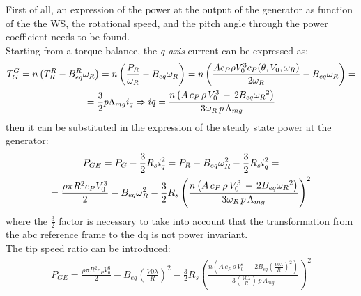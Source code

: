 First of all, an expression of the power at the output of the generator as function of the the WS, the rotational speed, and the pitch angle through the power coefficient needs to be found. \\
Starting from a torque balance, the \textit{q-axis} current can be expressed as:
\begin{gather}
  T_G^G = n\left(T_R^R - B_{eq}^R\omega_R\right) = n\left(\frac{P_R}{\omega_R} - B_{eq}\omega_R\right) = n\left(\frac{A c_P \rho V_0^3 c_P(\theta, V_0, \omega_R)}{2\omega_R} - B_{eq}\omega_R\right) = \notag \\
   = \frac{3}{2}p\Lambda_{mg}i_q \Rightarrow iq = \frac{n\left(A \, c_P \, \rho \, V_0^3 \,-\,2B_{eq}{\omega_R}^2\right)}{3\omega_R\,p\,\Lambda_{mg}} 
\end{gather}
then it can be substituted in the expression of the steady state power at the generator:
\begin{gather}
  P_{GE} = P_{G} - \frac{3}{2} R_s i_q^2 = P_R - B_{eq}\omega_R^2 - \frac{3}{2} R_s i_q^2 = \\ \notag
  =\frac{\rho\pi R^2c_PV_0^3}{2} - B_{eq}\omega_R^2-\frac{3}{2}R_s\left(\frac{n\left(A \, c_P \, \rho \, V_0^3 \,-\,2B_{eq}{\omega_R}^2\right)}{3\omega_R\,p\,\Lambda_{mg}}\right)^2 \notag \label{eq:P_G_out_eq}
\end{gather}
where the $\frac{3}{2}$ factor is necessary to take into account that the transformation from the abc reference frame to the dq is not power invariant.\\
The tip speed ratio can be introduced:
\begin{gather}
  P_{GE} = \frac{\rho\pi R^2c_PV_0^3}{2} - B_{eq}\left(\frac{V0\lambda}{R}\right)^2-\frac{3}{2}R_s\left(\frac{n\left(A \, c_P \, \rho \, V_0^3 \,-\,2B_{eq}{\left(\frac{V0\lambda}{R}\right)}^2\right)}{3\left(\frac{V0\lambda}{R}\right)\,p\,\Lambda_{mg}}\right)^2 \label{eq:P_G_out_lambda}
\end{gather} 



